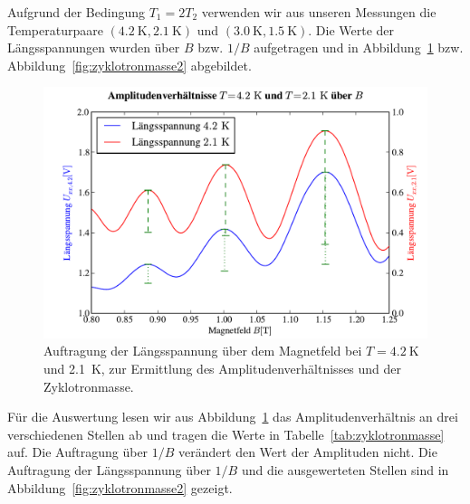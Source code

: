 \documentclass[paper=a4,fontsize=10pt,DIV=18,twocolumn,parskip=half]{scrartcl}
\numberwithin{equation}{section}    %
\begin{document}
Aufgrund der Bedingung $T_{1}=2T_{2}$ verwenden wir aus unseren Messungen die Temperaturpaare $(\SI{4.2}{\kelvin},\SI{2.1}{\kelvin})$ und $(\SI{3.0}{\kelvin},\SI{1.5}{\kelvin})$. Die Werte der Längsspannungen wurden über $B$ bzw. $1/B$ aufgetragen und in Abbildung~\ref{fig:zyklotronmasse} bzw. Abbildung~\ref{fig:zyklotronmasse2} abgebildet.
\begin{figure}[htp]
	\begin{center}
		\includegraphics[width=\columnwidth]{Data-Plots/11-4,2-2,1-zyklotron-B.pdf}
		\caption{Auftragung der Längsspannung über dem Magnetfeld bei $T=\SI{4.2}{\kelvin}$ und \SI{2.1}{\kelvin}, zur Ermittlung des Amplitudenverhältnisses und der Zyklotronmasse.}
		\label{fig:zyklotronmasse}
	\end{center}
\end{figure}
Für die Auswertung lesen wir aus Abbildung~\ref{fig:zyklotronmasse} das Amplitudenverhältnis an drei verschiedenen Stellen ab und tragen die Werte in Tabelle~\ref{tab:zyklotronmasse} auf. Die Auftragung über $1/B$ verändert den Wert der Amplituden nicht. Die Auftragung der Längsspannung über $1/B$ und die ausgewerteten Stellen sind in Abbildung~\ref{fig:zyklotronmasse2} gezeigt.
\end{document}
